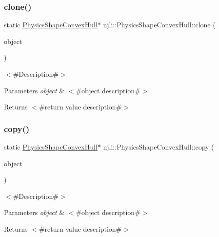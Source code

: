 \subsubsection{\texorpdfstring{clone()}{clone()}}
{\footnotesize\ttfamily static \mbox{\hyperlink{classnjli_1_1_physics_shape_convex_hull}{Physics\+Shape\+Convex\+Hull}}$\ast$ njli\+::\+Physics\+Shape\+Convex\+Hull\+::clone (\begin{DoxyParamCaption}\item[{const \mbox{\hyperlink{classnjli_1_1_physics_shape_convex_hull}{Physics\+Shape\+Convex\+Hull}} \&}]{object }\end{DoxyParamCaption})\hspace{0.3cm}{\ttfamily [static]}}

$<$\#\+Description\#$>$


\begin{DoxyParams}{Parameters}
{\em object} & $<$\#object description\#$>$\\
\hline
\end{DoxyParams}
\begin{DoxyReturn}{Returns}
$<$\#return value description\#$>$ 
\end{DoxyReturn}
\mbox{\label{classnjli_1_1_physics_shape_convex_hull_a8d7c4203a34f5db7faa52f594fe4bbf0}} 
\subsubsection{\texorpdfstring{copy()}{copy()}}
{\footnotesize\ttfamily static \mbox{\hyperlink{classnjli_1_1_physics_shape_convex_hull}{Physics\+Shape\+Convex\+Hull}}$\ast$ njli\+::\+Physics\+Shape\+Convex\+Hull\+::copy (\begin{DoxyParamCaption}\item[{const \mbox{\hyperlink{classnjli_1_1_physics_shape_convex_hull}{Physics\+Shape\+Convex\+Hull}} \&}]{object }\end{DoxyParamCaption})\hspace{0.3cm}{\ttfamily [static]}}

$<$\#\+Description\#$>$


\begin{DoxyParams}{Parameters}
{\em object} & $<$\#object description\#$>$\\
\hline
\end{DoxyParams}
\begin{DoxyReturn}{Returns}
$<$\#return value description\#$>$ 
\end{DoxyReturn}
\mbox{\label{classnjli_1_1_physics_shape_convex_hull_a5f777094ab8a8507f0c077456272db93}} 
